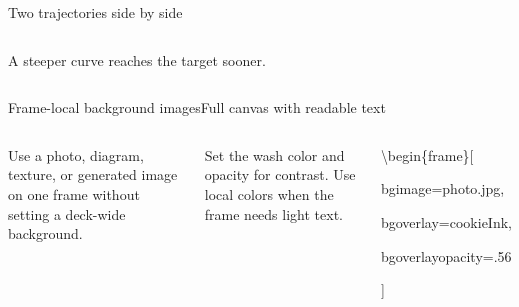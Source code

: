 \documentclass[aspectratio=169]{beamer}
\begin{document}
\begin{frame}{Two trajectories side by side}
\begin{columns}[T,onlytextwidth]
\begin{cookiecard}[title=Minimum time]
        \vspace{.35em}
        \footnotesize A steeper curve reaches the target sooner.
      \end{cookiecard}
  \end{columns}
\end{frame}

{
\begin{frame}{Frame-local background images}{Full canvas with readable text}
  \begin{columns}[T,onlytextwidth]
      \Large
      Use a photo, diagram, texture, or generated image on one frame without setting a deck-wide background.

      \vspace{.8em}
      \normalsize
      Set the wash color and opacity for contrast. Use local colors when the frame needs light text.

      \begin{cookiecard}[title=Frame syntax]
        \ttfamily\small
        \textbackslash begin\{frame\}[\par
        \quad bgimage=photo.jpg,\par
        \quad bgoverlay=cookieInk,\par
        \quad bgoverlayopacity=.56\par
        ]
      \end{cookiecard}
  \end{columns}
\end{frame}
}
\end{document}
